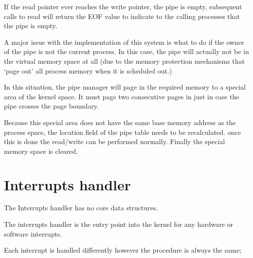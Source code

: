 \documentclass[a4paper]{report}
\begin{document}
If the read pointer ever reaches the write pointer, the pipe is empty, subsequent calls to read will return the EOF value to indicate to the calling processes that the pipe is empty.

A major issue with the implementation of this system is what to do if the owner of the pipe is not the current process. In this case, the pipe will actually not be in the virtual memory space at all (due to the memory protection mechanisms that `page out' all process memory when it is scheduled out.)

In this situation, the pipe manager will page in the required memory to a special area of the kernel space. It must page two consecutive pages in just in case the pipe crosses the page boundary.

Because this special area does not have the same base memory address as the process space, the location field of the pipe table needs to be recalculated. once this is done the read/write can be performed normally. Finally the special memory space is cleared.











\section{Interrupts handler}

The Interrupts handler has no core data structures.

The interrupts handler is the entry point into the kernel for any hardware or software interrupts.

Each interrupt is handled differently however the procedure is always the same;
\end{document}
